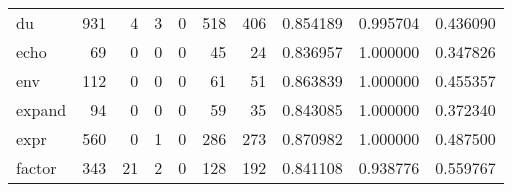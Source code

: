 \begin{tabular}{lrrrrrrrrr}
du        &                                   931 &                                                  4 &                                                  3 &                                                  0 &                                                518 &                                                406 &                                           0.854189 &                               0.995704 &                             0.436090 \\
echo      &                                    69 &                                                  0 &                                                  0 &                                                  0 &                                                 45 &                                                 24 &                                           0.836957 &                               1.000000 &                             0.347826 \\
env       &                                   112 &                                                  0 &                                                  0 &                                                  0 &                                                 61 &                                                 51 &                                           0.863839 &                               1.000000 &                             0.455357 \\
expand    &                                    94 &                                                  0 &                                                  0 &                                                  0 &                                                 59 &                                                 35 &                                           0.843085 &                               1.000000 &                             0.372340 \\
expr      &                                   560 &                                                  0 &                                                  1 &                                                  0 &                                                286 &                                                273 &                                           0.870982 &                               1.000000 &                             0.487500 \\
factor    &                                   343 &                                                 21 &                                                  2 &                                                  0 &                                                128 &                                                192 &                                           0.841108 &                               0.938776 &                             0.559767 \\

\end{tabular}
